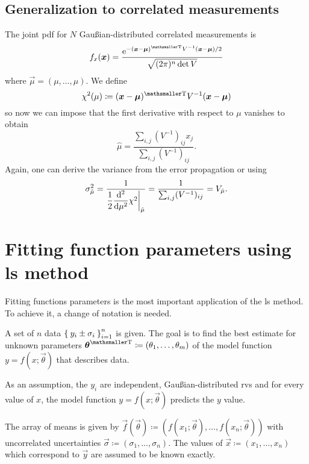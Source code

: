 \documentclass[
	10pt,
	draft
]{scrreprt}
\newcommand{\transpose}[1]{\ensuremath{#1}^{\mathrm{ \mathsmaller T}}}
\newcommand{\eu}{\ensuremath{\mathrm{e}}}
\newcommand{\deriv}[3][]{\dfrac{\ud^{#1}#2}{\ud #3^{#1}}}%
\begin{document}
	\subsection{Generalization to correlated measurements}

The joint \ac{pdf} for $N$ Gau\ss{}ian-distributed correlated measurements is
\begin{equation}
f_x(\vec{x}) = \frac{\eu^{-\transpose{(\vec{x}-\vec{\mu})}V^{-1}(\vec{x}-\vec{\mu})/2}}{\sqrt{(2\pi)^n\det V}}
\end{equation}
where $\vec{\mu} = (\mu,\dots,\mu)$.
We define
\begin{equation}
\chi^2(\mu) \coloneqq \transpose{(\vec{x}-\vec{\mu})}V^{-1}(\vec{x}-\vec{\mu})
\end{equation}
so now we can impose that the first derivative with respect to $\mu$ vanishes to obtain
\begin{equation}
\hat\mu = 
\frac{\sum_{i,j}(V^{-1})_{ij}x_j}{\sum_{i,j}(V^{-1})_{ij}}.
\end{equation}
Again, one can derive the variance from the error propagation or using
\begin{equation}
\sigma^2_{\hat\mu} = \frac{1}{\dfrac{1}{2} \deriv[2]{}{\mu}\chi^2\bigg\rvert_{\hat\mu}} = \frac{1}{\sum_{i,j} (V^{-1})_{ij}}   = V_{\hat\mu}.
\end{equation}



		\section{Fitting function parameters using \acs{ls} method}

Fitting functions parameters is the most important application of the \ac{ls} method.
To achieve it, a change of notation is needed.


A set of $n$ data $\Set{y_i\pm\sigma_i}_{i=1}^n$ is given.
The goal is to find the best estimate for unknown parameters $\transpose{\vec{\theta}} \coloneqq (\theta_1,\dots,\theta_m)$ of the model function $y = f(x;\vec{\theta})$ that describes data.


As an assumption, the $y_i$ are independent, Gau\ss{}ian-distributed \acp{rv} and for every value of $x$, the model function $y=f(x;\vec{\theta})$ predicts the $y$ value.


The array of means is given by $\vec{f}(\vec{\theta}) \coloneqq (f(x_1;\vec{\theta}),\dots,f(x_n;\vec{\theta}))$ with uncorrelated uncertainties $\vec{\sigma}\coloneqq (\sigma_1,\dots,\sigma_n)$.
The values of $\vec{x}\coloneqq (x_1,\dots,x_n)$ which correspond to $\vec{y}$ are assumed to be known exactly.
\end{document}
